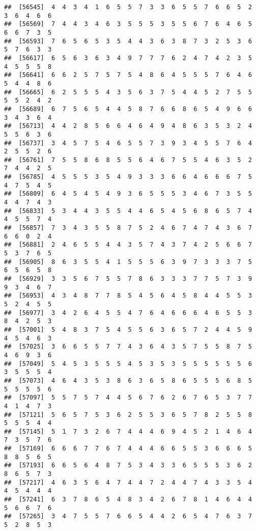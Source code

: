 \documentclass[
]{book}
\begin{document}
\begin{verbatim}
##  [56545]  4  4  3  4  1  6  5  5  7  3  3  6  5  5  7  6  6  5  2  3  6  4  6  6
##  [56569]  7  4  4  3  4  6  3  5  5  5  3  5  5  6  7  6  4  6  5  6  6  7  3  5
##  [56593]  7  6  5  6  5  3  5  4  4  3  6  3  8  7  3  2  5  3  6  5  7  6  3  3
##  [56617]  6  5  6  3  6  3  4  9  7  7  7  6  2  4  7  4  2  3  5  4  5  5  5  8
##  [56641]  6  6  2  5  7  5  7  5  4  8  6  4  5  5  5  7  6  4  6  5  4  4  8  6
##  [56665]  6  2  5  5  5  4  3  5  6  3  7  5  4  4  5  2  7  5  5  5  5  2  4  2
##  [56689]  6  7  5  6  5  4  4  5  8  7  6  6  8  6  5  4  9  6  6  3  4  3  6  4
##  [56713]  4  4  2  8  5  6  6  4  6  4  9  4  8  6  3  5  3  2  4  5  5  6  3  6
##  [56737]  3  4  5  7  5  4  6  5  5  7  3  9  3  4  5  5  7  6  4  2  5  5  2  6
##  [56761]  7  5  5  8  6  8  5  5  6  4  6  7  5  5  4  6  3  5  2  7  4  4  2  5
##  [56785]  4  5  5  5  3  5  4  9  3  3  3  6  6  4  6  6  6  7  5  4  7  5  4  5
##  [56809]  6  4  5  4  5  4  9  3  6  5  5  5  3  4  6  7  3  5  5  4  4  7  4  3
##  [56833]  5  3  4  4  3  5  5  4  4  6  5  4  5  6  8  6  5  7  4  4  5  5  7  4
##  [56857]  7  3  4  3  5  5  8  7  5  2  4  6  7  4  7  4  3  6  7  6  6  0  2  4
##  [56881]  2  4  6  5  5  4  4  3  5  7  4  3  7  4  2  5  6  6  7  5  3  7  6  5
##  [56905]  8  6  3  5  5  4  1  5  5  5  6  3  9  7  3  3  3  7  5  6  5  6  5  8
##  [56929]  3  3  5  6  7  5  5  7  8  6  3  3  3  7  7  5  7  3  9  9  3  4  6  7
##  [56953]  4  3  4  8  7  7  8  5  4  5  6  4  5  8  4  4  5  5  3  5  2  4  5  5
##  [56977]  3  4  2  6  4  5  5  4  7  6  4  6  6  6  4  6  5  5  3  8  4  2  5  3
##  [57001]  5  4  8  3  7  5  4  5  5  6  3  6  5  7  2  4  4  5  9  4  5  4  6  3
##  [57025]  3  6  6  5  5  7  7  4  3  6  4  3  5  7  5  5  8  7  5  4  6  9  3  6
##  [57049]  5  4  5  3  5  5  5  4  5  3  5  3  5  5  5  5  5  5  6  3  5  5  5  4
##  [57073]  4  6  4  3  5  3  8  6  3  6  5  8  6  5  5  5  6  8  5  5  5  5  5  6
##  [57097]  5  5  7  5  7  4  4  5  6  7  6  2  6  7  6  5  3  7  7  4  1  4  7  3
##  [57121]  5  6  5  7  5  3  6  2  5  5  3  6  5  7  8  2  5  5  8  5  5  5  4  4
##  [57145]  5  1  7  3  2  6  7  4  4  4  6  9  4  5  2  1  4  6  4  7  3  5  7  6
##  [57169]  6  6  6  7  7  6  7  4  4  4  6  6  5  5  3  6  6  6  5  8  8  5  6  5
##  [57193]  6  6  5  6  4  8  7  5  3  4  3  3  6  5  5  5  3  6  2  8  6  5  7  3
##  [57217]  4  6  3  5  6  4  7  4  4  7  2  4  4  7  4  3  3  5  4  4  5  4  4  4
##  [57241]  6  3  7  8  6  5  4  8  3  4  2  6  7  8  1  4  6  4  4  5  6  6  7  6
##  [57265]  3  4  7  5  5  7  6  6  5  4  4  2  6  5  4  7  6  3  7  5  2  8  5  3

\end{verbatim}
\end{document}
